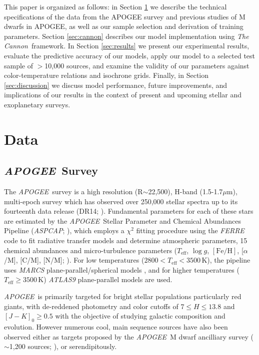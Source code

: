 \documentclass[modern]{aastex62}
\newcommand{\apogee}{\textsl{APOGEE}}
\newcommand{\thecannon}{\textsl{The Cannon}}
\newcommand{\aspcap}{\textsl{ASPCAP}}
\newcommand{\teff}{T_{\mathrm{eff}}}
\newcommand{\logg}{\log g}
\newcommand{\feh}{[{\mathrm{Fe}/\mathrm{H}}]}
\begin{document}
This paper is organized as follows: in Section \ref{sec:data} we describe the technical specifications of the data from the APOGEE survey and previous studies of M dwarfs in APOGEE, as well as our sample selection and derivation of training parameters. 
Section \ref{sec:cannon} describes our model implementation using \thecannon\ framework.
In Section \ref{sec:results} we present our experimental results, evaluate the predictive accuracy of our models, apply our model to a selected test sample of $>$10,000 sources, and examine the validity of our parameters against color-temperature relations and isochrone grids.
Finally, in Section \ref{sec:discussion} we discuss model performance, future improvements, and implications of our results in the context of present and upcoming stellar and exoplanetary surveys.


\section{Data} \label{sec:data}

\subsection{\apogee\ Survey}

The \apogee\ survey is a high resolution (R$\sim$22,500), H-band (1.5-1.7$\mu$m), multi-epoch survey which has observed over 250,000 stellar spectra up to its fourteenth data release (DR14; \citealt{Abolfathi:2017}). Fundamental parameters for each of these stars are estimated by the \apogee\ Stellar Parameter and Chemical Abundances Pipeline (\aspcap; \citealt{Perez:2016}), which employs a $\chi^2$ fitting procedure using the \textsl{FERRE} code to fit radiative transfer models and determine atmospheric parameters, 15 chemical abundances and micro-turbulence parameters ($\teff$, $\logg$, $\feh$, [$\alpha$/M], [C/M], [N/M]; \citealt{Meszaros:2012}). For low temperatures ($2800<\teff<3500$\,K), the pipeline uses \textsl{MARCS} plane-parallel/spherical models \citep{Gustafsson:2008}, and for higher temperatures ($\teff\geq3500$\,K) \textsl{ATLAS9} \citep{Castelli:2004} plane-parallel models are used.

\apogee\ is primarily targeted for bright stellar populations particularly red giants, with de-reddened photometry and color cutoffs of $7 \leq H \leq 13.8$ and $[J-K]_0 \geq 0.5$ \citep{Zasowski:2013} with the objective of studying galactic composition and evolution. However numerous cool, main sequence sources have also been observed either as targets proposed by the \apogee\ M dwarf ancilliary survey ($\sim$1,200 sources; \citealt{Desphande:2013}), or serendipitously. 
\end{document}

